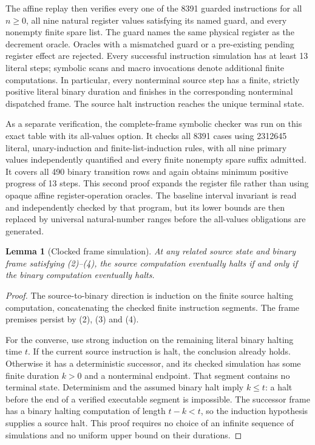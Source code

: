 \documentclass[11pt]{article}
\newtheorem{lemma}{Lemma}
\begin{document}
The affine replay then verifies every one of the 8391 guarded instructions
for all $n\geq0$, all nine natural register values satisfying its named
guard, and every nonempty finite spare list. The guard names the same
physical register as the decrement oracle. Oracles with a mismatched guard
or a pre-existing pending register effect are rejected. Every successful
instruction simulation has at least 13 literal steps; symbolic scans and
macro invocations denote additional finite computations. In particular,
every nonterminal source step has a finite, strictly positive literal
binary duration and finishes in the corresponding nonterminal dispatched
frame. The source halt instruction reaches the unique terminal state.

As a separate verification, the complete-frame symbolic checker was run on
this exact table with its all-values option. It checks all 8391 cases using
2312645 literal, unary-induction and finite-list-induction rules, with all
nine primary values independently quantified and every finite nonempty
spare suffix admitted. It covers all 490 binary transition rows and again
obtains minimum positive progress of 13 steps. This second proof expands
the register file rather than using opaque affine register-operation
oracles. The baseline interval invariant is read and independently checked
by that program, but its lower bounds are then replaced by universal
natural-number ranges before the all-values obligations are generated.

\begin{lemma}[Clocked frame simulation]
At any related source state and binary frame satisfying (2)--(4), the
source computation eventually halts if and only if the binary computation
eventually halts.
\end{lemma}

\begin{proof}
The source-to-binary direction is induction on the finite source halting
computation, concatenating the checked finite instruction segments. The
frame premises persist by (2), (3) and (4).

For the converse, use strong induction on the remaining literal binary
halting time $t$. If the current source instruction is halt, the conclusion
already holds. Otherwise it has a deterministic successor, and its checked
simulation has some finite duration $k>0$ and a nonterminal endpoint.
That segment contains no terminal state. Determinism and the assumed
binary halt imply $k\leq t$: a halt before the end of a verified executable
segment is impossible. The successor frame has a binary halting computation
of length $t-k<t$, so the induction hypothesis supplies a source halt.
This proof requires no choice of an infinite sequence of simulations and
no uniform upper bound on their durations.
\end{proof}
\end{document}
